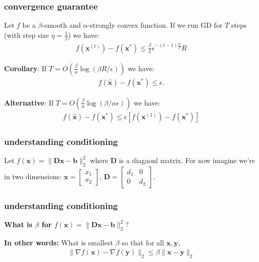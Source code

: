 \documentclass[compress]{beamer}
\newcommand{\bv}[1]{\mathbf{#1}}
\begin{document}
\begin{frame}[t]
	\frametitle{convergence guarantee}
	\begin{corollary}
		Let $f$ be a $\beta$-smooth and $\alpha$-strongly convex function. If we run GD for $T$ steps (with step size $\eta = \frac{1}{\beta}$) we have:
		\begin{align*}
		f(\bv{x}^{(t)}) - f(\bv{x}^*)  \leq \frac{\beta}{2} e^{-(t-1)\frac{\alpha}{\beta}} R
		\end{align*} 
	\end{corollary}	
	\textbf{Corollary}: 
	If \alert{$T = O\left(\frac{\beta}{\alpha}\log(\beta R/ \epsilon)\right)$} we have:
	\begin{align*}
	f(\hat{\bv{x}}) - f(\bv{x}^*) \leq \epsilon.
	\end{align*}
	
	\textbf{Alternative}: 
	If \alert{$T = O\left(\frac{\beta}{\alpha}\log(\beta/\alpha \epsilon)\right)$} we have:
	\begin{align*}
	f(\hat{\bv{x}}) - f(\bv{x}^*) \leq \epsilon \left[f(\bv{x}^{(1)}) - f(\bv{x}^*)\right]
	\end{align*}

\end{frame}

\begin{frame}[t]
	\frametitle{understanding conditioning}
	Let $f(\bv{x}) = \|\bv{D}\bv{x} - \bv{b}\|_2^2$ where $\bv{D}$ is a diagaonl matrix. For now imagine we're in two dimensions: $\bv{x} = \begin{bmatrix}
	x_1\\
	x_2
	\end{bmatrix}$, $\bv{D} = \begin{bmatrix}
	d_1 & 0 \\
	0 & d_2
	\end{bmatrix}
	$.
\end{frame}

\begin{frame}[t]
	\frametitle{understanding conditioning}
	\begin{center}
	\textbf{What is $\beta$ for $f(\bv{x}) = \|\bv{D}\bv{x} - \bv{b}\|_2^2$}?
	\end{center}
		
	\textbf{In other words:} What is smallest $\beta$ so that for all $\bv{x}, \bv{y}$,
	\begin{align*}
		\|\nabla f(\bv{x}) - \nabla f(\bv{y})\|_2 \leq \beta \|\bv{x} - \bv{y}\|_2
	\end{align*}
\end{frame}
\end{document}
